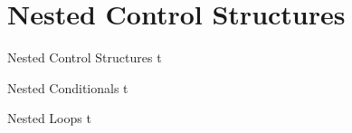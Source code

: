 \documentclass[../lecture3-flowofcontrol.tex]{subfiles}
\begin{document}
\section{Nested Control Structures}


\begin{frame}[fragile]{Nested Control Structures}
t
\end{frame}


\begin{frame}[fragile]{Nested Conditionals}
t
\end{frame}


\begin{frame}[fragile]{Nested Loops}
t
\end{frame}

\end{document}
